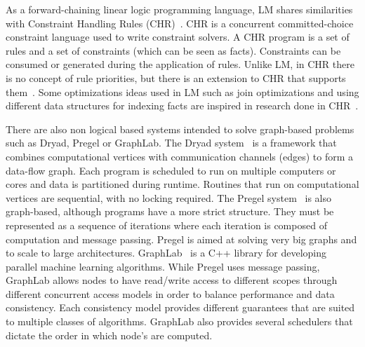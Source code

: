 As a forward-chaining linear logic programming language, LM shares similarities with Constraint Handling Rules (CHR)~\cite{Betz:2005kx,Betz:2013:LBA:2422085.2422086,DBLP:journals/corr/abs-1006-3039}.
CHR is a concurrent committed-choice constraint language used to write constraint solvers. A CHR program is a set of rules and
a set of constraints (which can be seen as facts). Constraints can be consumed or generated during the application of rules.
Unlike LM, in CHR there is no
concept of rule priorities, but there is an extension to CHR that supports them~\cite{DeKoninck:2007:URP:1273920.1273924}.
Some optimizations ideas used in LM such as join optimizations and using different data structures for indexing facts
are inspired in research done in CHR~\cite{DBLP:journals/corr/cs-PL-0408025}.

There are also non logical based systems intended to solve graph-based problems such as Dryad, Pregel or GraphLab.
The Dryad system~\cite{Isard:2007:DDD:1272996.1273005} is a framework that combines computational vertices
with communication channels (edges) to form a data-flow graph. Each program is scheduled to
run on multiple computers or cores and data is partitioned during runtime. Routines that run on computational vertices
are sequential, with no locking required.
The Pregel system~\cite{Malewicz:2010:PSL:1807167.1807184} is also graph-based, although programs have a more strict
structure. They must be represented as a sequence of iterations where each iteration is composed of computation and message passing.
Pregel is aimed at solving very big graphs
and to scale to large architectures. GraphLab~\cite{GraphLab2010} is a C++ library for developing parallel machine learning algorithms. While
Pregel uses message passing, GraphLab allows nodes to have read/write access to different scopes through different concurrent access models in order to balance performance and data consistency. Each consistency model provides different guarantees that are suited to multiple classes of algorithms. GraphLab also provides several schedulers that dictate the order in which node's are computed.